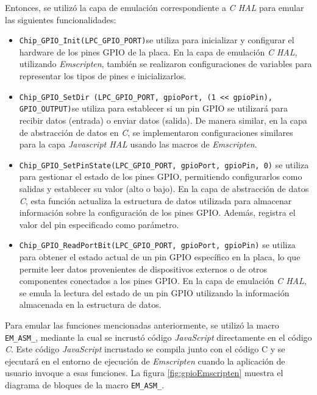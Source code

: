 Entonces, se utilizó la capa de emulación correspondiente a \textit{C HAL} para emular las siguientes funcionalidades:

\begin{itemize}
	\item \texttt{Chip\_GPIO\_Init(LPC\_GPIO\_PORT)}se utiliza para inicializar y configurar el hardware de los pines GPIO de la placa. En la capa de emulación \textit{C HAL}, utilizando  \textit{Emscripten}, también se realizaron configuraciones de variables para representar los tipos de pines e inicializarlos.
	
	\item \texttt{Chip\_GPIO\_SetDir (LPC\_GPIO\_PORT, gpioPort, \newline (1 \<<\<<  gpioPin), GPIO\_OUTPUT)}se utiliza para establecer si un pin GPIO se utilizará para recibir datos (entrada) o enviar datos (salida). De manera similar, en la capa de abstracción de datos en \textit{C}, se implementaron configuraciones similares para la capa \textit{Javascript HAL} usando las macros de \textit{Emscripten}.
	
	\item \texttt{Chip\_GPIO\_SetPinState(LPC\_GPIO\_PORT, gpioPort, \newline gpioPin, 0)} se utiliza para gestionar el estado de los pines GPIO, permitiendo configurarlos como salidas y establecer su valor (alto o bajo). En la capa de abstracción de datos \textit{C}, esta función actualiza la estructura de datos utilizada para almacenar información sobre la configuración de los pines GPIO. Además, registra el valor del pin especificado como parámetro.

	\item \texttt{Chip\_GPIO\_ReadPortBit(LPC\_GPIO\_PORT, gpioPort, \newline gpioPin)} se utiliza para obtener el estado actual de un pin GPIO específico en la placa, lo que permite leer datos provenientes de dispositivos externos o de otros componentes conectados a los pines GPIO. En la capa de emulación \textit{C HAL}, se emula la lectura del estado de un pin GPIO utilizando la información almacenada en la estructura de datos.
\end{itemize}


Para emular las funciones mencionadas anteriormente, se utilizó la macro \newline \texttt{EM\_ASM\_}, mediante la cual se incrustó código \textit{JavaScript} directamente en el código \textit{C}. Este código \textit{JavaScript} incrustado se compila junto con el código C y se ejecutará en el entorno de ejecución de \textit{Emscripten}  cuando la aplicación de usuario invoque a esas funciones. La figura \ref{fig:gpioEmscripten} muestra el diagrama de bloques de la macro \texttt{EM\_ASM\_}.

